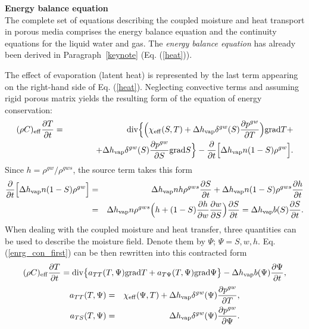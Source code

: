 {\bf Energy balance equation}\\

The complete set of equations describing the coupled moisture and heat transport in porous media comprises 
the energy balance equation and the continuity equations for the liquid water and gas. 
The {\it energy balance equation} has already been derived in Paragraph~\ref{keynote} (Eq. (\ref{heat})).

The effect of evaporation (latent heat) is represented by the last term appearing on the right-hand 
side of Eq. (\ref{heat}). Neglecting convective terms and assuming rigid porous matrix yields 
the resulting form of the equation of energy conservation:
\begin{eqnarray}\label{enrg_con_first}
( \rho C)_{\rm eff} \frac{\partial T}{\partial t} &=& {\rm div} \Big\{ \Big(\chi_{\rm eff} (S, 
T) + \Delta h_{\rm vap} \delta^{gw}(S) \frac{\partial p^{gw}}{\partial T} \Big) {\rm grad} T +\\ 
& &\qquad \quad + \Delta h_{\rm vap} \delta^{gw}(S) \frac{\partial p^{gw}}{\partial S} {\rm grad} S \Big\} 
- \frac{\partial}{\partial t}
\Big[\Delta h_{\rm vap} n(1-S) \rho^{gw} \Big].\nonumber
\end{eqnarray}
Since $h = \rho^{gw}/\rho^{gws}$, the source term takes this form
\begin{eqnarray}
\frac{\partial}{\partial t} \Big[\Delta h_{\rm vap} n(1-S) \rho^{gw} \Big] &=& \Delta h_{\rm vap} n h \rho^{gws} 
\frac{\partial S}{\partial t} + \Delta h_{\rm vap} n (1 - S)\rho^{gws} \frac{\partial h}{\partial t}\\
&=& \Delta h_{\rm vap} n \rho^{gws} \Big(h + (1-S)\frac{\partial h}{\partial w} \frac{\partial w}{\partial S} \Big) 
\frac{\partial S}{\partial t} = \Delta h_{\rm vap} b(S) \frac{\partial S}{\partial t}\nonumber.
\end{eqnarray}
When dealing with the coupled moisture and heat transfer, three quantities can be used to describe the moisture field. 
Denote them by $\varPsi$; 
$\varPsi = S, w, h$. 
Eq. (\ref{enrg_con_first}) can be then rewritten into this contracted form
\begin{eqnarray}
( \rho C)_{\rm eff} \frac{\partial T}{\partial t} = {\rm div} \big\{ a_{T T} (T, \Psi) {\rm grad} T + 
a_{T \Psi} (T, \Psi) {\rm grad} \Psi \big\} - \Delta h_{\rm vap} b(\Psi)\frac{\partial \Psi}{\partial t},
\end{eqnarray}
\begin{eqnarray}
a_{T T} (T, \Psi) &=& \chi_{\rm eff} (\Psi,T) + \Delta h_{\rm vap} \delta^{gw}(\Psi) \frac{\partial p^{gw}}{\partial T},
\nonumber\\
a_{T S} (T, \Psi) &=& \Delta h_{\rm vap} \delta^{gw}(\Psi) \frac{\partial p^{gw}}{\partial \Psi}.\nonumber
\end{eqnarray}

